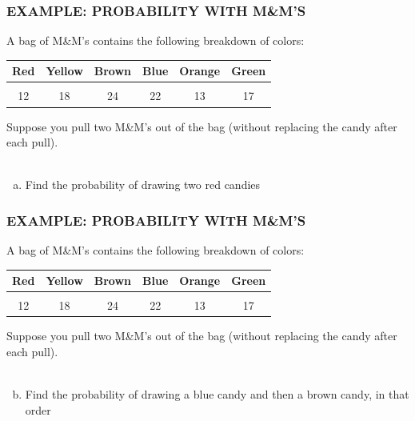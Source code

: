 \documentclass[8pt]{beamer}
\newcommand{\extitle}[1]{\frametitle{\fontfamily{fvs}\selectfont \small\color{black!70!blue!80!cyan}\uppercase{\bfseries Example: #1}}}
\def\solblank{\begin{tcolorbox}[colframe=black!50!blue!50!cyan,
colback=white,
bottomrule=0mm,
rightrule=0mm,
sharp corners=all] 
\vspace{6in}
\text{}
\end{tcolorbox}}
\begin{document}
\begin{frame}
\extitle{Probability with M\&M's}
A bag of M\&M's contains the following breakdown of colors:

\begin{center}
\begin{tabular}{c c c c c c}
\textbf{Red} & \textbf{Yellow} &  \textbf{Brown} & \textbf{Blue} & \textbf{Orange} & \textbf{Green} \\ \hline
& & & & & \\
12 & 18 & 24 &  22 &  13 & 17 \\
\end{tabular}
\end{center}
Suppose you pull two M\&M's out of the bag (without replacing the candy after each pull).\\ \text{}\\

\begin{enumerate}[(a)]
\item Find the probability of drawing two red candies
\end{enumerate}

\solblank
\end{frame}

\begin{frame}
\extitle{Probability with M\&M's}
A bag of M\&M's contains the following breakdown of colors:

\begin{center}
\begin{tabular}{c c c c c c}
\textbf{Red} & \textbf{Yellow} &  \textbf{Brown} & \textbf{Blue} & \textbf{Orange} & \textbf{Green} \\ \hline
& & & & & \\
12 & 18 & 24 &  22 &  13 & 17 \\
\end{tabular}
\end{center}
Suppose you pull two M\&M's out of the bag (without replacing the candy after each pull).\\ \text{}\\

\begin{enumerate}[(a)]
\setcounter{enumi}{1}
\item Find the probability of drawing a blue candy and then a brown candy, in that order
\end{enumerate}

\solblank
\end{frame}
\end{document}
